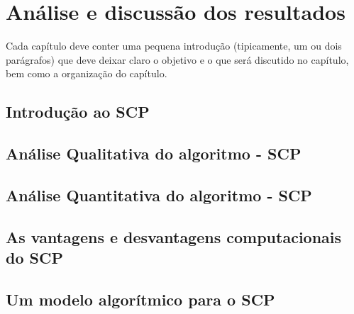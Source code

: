 
\chapter{\larger Análise e discussão dos resultados}

Cada capítulo deve conter uma pequena introdução (tipicamente, um ou dois parágrafos) que deve deixar claro o objetivo e o que será discutido no capítulo, bem como a organização do capítulo.


\section{Introdução ao SCP}
\section{Análise Qualitativa do algoritmo - SCP}
\section{Análise Quantitativa do algoritmo - SCP}
\section{As vantagens e desvantagens computacionais do SCP}
\section{Um modelo algorítmico para o SCP}

